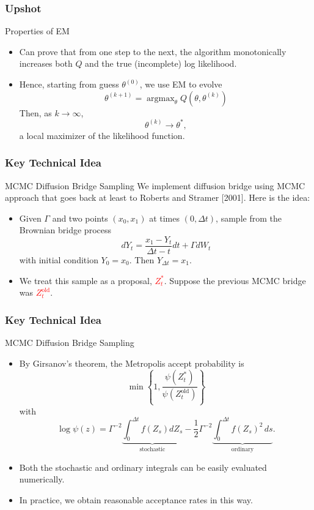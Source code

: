 \documentclass{beamer}
\begin{document}
\begin{frame}
\frametitle{Upshot}
\begin{block}{Properties of EM}
\begin{itemize}
\item Can prove that from one step to the next, the algorithm monotonically increases both $Q$ and the true (incomplete) log likelihood.
\item Hence, starting from guess $\theta^{(0)}$, we use EM to evolve
$$
\theta^{(k+1)} = \operatorname{argmax}_\theta Q(\theta,\theta^{(k)})
$$
Then, as $k \to \infty$,
$$
\theta^{(k)} \to \theta^{\ast},
$$
a local maximizer of the likelihood function.
\end{itemize}
\end{block}
\end{frame}

\begin{frame}
\frametitle{Key Technical Idea}
\begin{block}{MCMC Diffusion Bridge Sampling}
We implement diffusion bridge using MCMC approach that goes back at least to Roberts and Stramer [2001].  Here is the idea:
\begin{itemize}
\item Given $\Gamma$ and two points $(x_0, x_1)$ at times $(0, \Delta t)$, sample from the Brownian bridge process
$$
dY_t = \frac{x_1 - Y_t}{\Delta t - t} dt + \Gamma dW_t
$$
with initial condition $Y_0 = x_0$.  Then $Y_{\Delta t} = x_1$.
\item We treat this sample as a proposal, \textcolor{red}{$Z_t^\ast$}.  Suppose the previous MCMC bridge was \textcolor{red}{$Z_t^\text{old}$}.
\end{itemize}
\end{block}
\end{frame}

\begin{frame}
\frametitle{Key Technical Idea}
\begin{block}{MCMC Diffusion Bridge Sampling}
\begin{itemize}
\item By Girsanov's theorem, the Metropolis accept probability is
$$
\min \left\{1, \frac{\psi(Z_t^\ast)}{\psi(Z_t^\text{old})} \right\}
$$
with
$$
\log \psi(z) = \Gamma^{-2} \underbrace{\int_0^{\Delta t} f(Z_s) dZ_s}_\text{stochastic} - \frac{1}{2} \Gamma^{-2} \underbrace{\int_0^{\Delta t} f(Z_s)^2 \, ds}_\text{ordinary}.
$$
\item Both the stochastic and ordinary integrals can be easily evaluated numerically.
\item In practice, we obtain reasonable acceptance rates in this way.
\end{itemize}
\end{block}
\end{frame}
\end{document}
